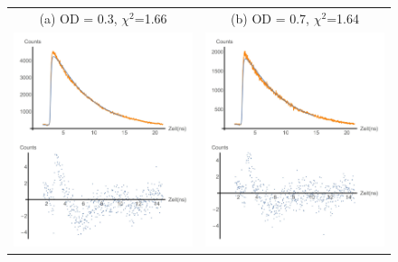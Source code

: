 \documentclass{article}
\begin{document}
\begin{figure}
\begin{tabular}{cc}
  (a) OD = 0.3, $\chi^2$=1.66                                 &   (b) OD = 0.7, $\chi^2$=1.64                               \\
  \includegraphics[width=\textwidth/2]{Bilder/FitOD11.jpg}  &   \includegraphics[width=\textwidth/2]{Bilder/FitOD15.jpg}\\

\end{tabular}
\end{figure}
\end{document}

